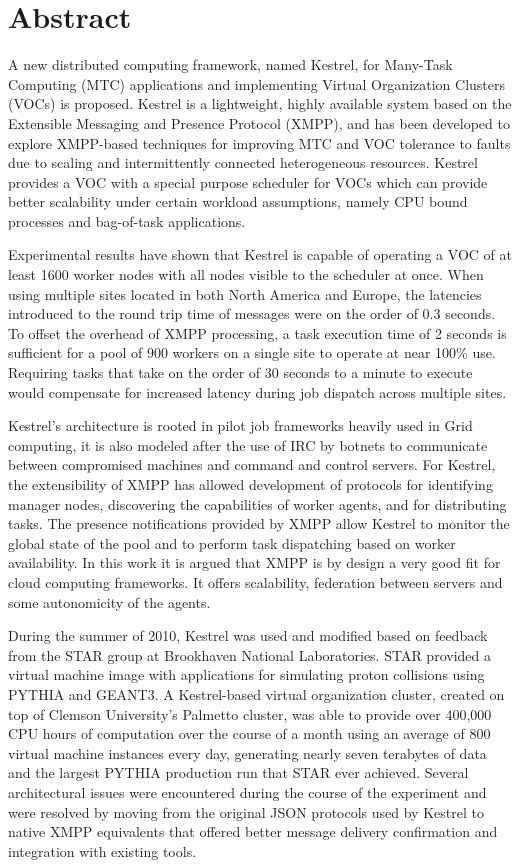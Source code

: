 \chapter*{Abstract}

A new distributed computing framework, named Kestrel, for Many-Task Computing
(MTC) applications and implementing Virtual Organization Clusters (VOCs) is
proposed. Kestrel is a lightweight, highly available system based on the
Extensible Messaging and Presence Protocol (XMPP), and has been developed to
explore XMPP-based techniques for improving MTC and VOC tolerance to faults due
to scaling and intermittently connected heterogeneous resources. Kestrel provides
a VOC with a special purpose scheduler for VOCs which can provide better scalability
under certain workload assumptions, namely CPU bound processes and bag-of-task
applications.

Experimental results have shown that Kestrel is capable of operating
a VOC of at least 1600 worker nodes with all nodes visible to the
scheduler at once. When using multiple sites located in both North
America and Europe, the latencies introduced to the round trip time
of messages were on the order of 0.3 seconds. To offset the overhead
of XMPP processing, a task execution time of 2 seconds is sufficient
for a pool of 900 workers on a single site to operate at near 100\%
use. Requiring tasks that take on the order of 30 seconds to a minute
to execute would compensate for increased latency during job dispatch
across multiple sites.

Kestrel's architecture is rooted in pilot job frameworks heavily used in Grid
computing, it is also modeled after the use of IRC by botnets to communicate 
between compromised machines and command and control servers. For Kestrel, the
extensibility of XMPP has allowed development of protocols for identifying
manager nodes, discovering the capabilities of worker agents, and for
distributing tasks. The presence notifications provided by XMPP allow Kestrel
to monitor the global state of the pool and to perform task dispatching based
on worker availability. In this work it is argued that XMPP is by design a very
good fit for cloud computing frameworks. It offers scalability, federation
between servers and some autonomicity of the agents.

During the summer of 2010, Kestrel was used and modified based on feedback from
the STAR group at Brookhaven National Laboratories. STAR provided a virtual
machine image with applications for simulating proton collisions using PYTHIA
and GEANT3. A Kestrel-based virtual organization cluster, created on top of
Clemson University's Palmetto cluster, was able to provide over 400,000 CPU
hours of computation over the course of a month using an average of 800 virtual
machine instances every day, generating nearly seven terabytes of data and the
largest PYTHIA production run that STAR ever achieved. Several architectural
issues were encountered during the course of the experiment and were resolved
by moving from the original JSON protocols used by Kestrel to native XMPP
equivalents that offered better message delivery confirmation and integration
with existing tools.
